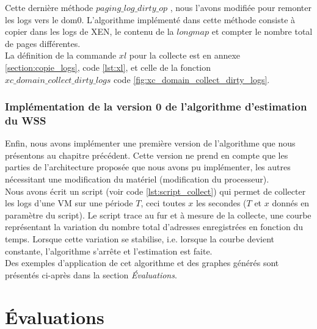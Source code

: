 \noindent Cette dernière méthode $paging\_log\_dirty\_op$ , nous l'avons modifiée pour remonter les logs vers le dom0. L'algorithme implémenté dans cette méthode consiste à copier dans les logs de XEN, le contenu de la $longmap$ et compter le nombre total de pages différentes.\\
La définition de la commande $xl$ pour la collecte est en annexe \ref{section:copie_logs}, code \ref{lst:xl}, et celle  de la fonction $xc\_domain\_collect\_dirty\_logs$ code \ref{fig:xc_domain_collect_dirty_logs}.

\subsubsection{Implémentation de la version 0 de l'algorithme d'estimation du WSS}
Enfin, nous avons implémenter une première version de l'algorithme que nous présentons au chapitre précédent. Cette version ne prend en compte que les parties de l'architecture proposée que nous avons pu implémenter, les autres nécessitant une modification du matériel (modification du processeur).\\
Nous avons écrit un script (voir code \ref{lst:script_collect}) qui permet de collecter les logs d'une VM sur une période $T$, ceci toutes $x$ les secondes ($T$ et $x$ donnés en paramètre du script). Le script trace au fur et à mesure de la collecte, une courbe représentant la variation du nombre total d'adresses enregistrées en fonction du temps. Lorsque cette variation se stabilise, i.e. lorsque la courbe devient constante, l'algorithme s'arrête et l'estimation est faite. \\
Des exemples d'application de cet algorithme et des graphes générés sont présentés ci-après dans la section \textit{Évaluations}.

\section{Évaluations}


